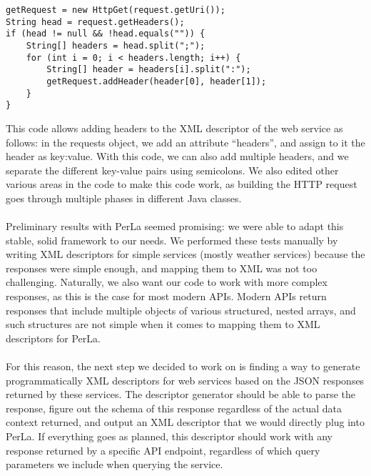 \begin{lstlisting}
getRequest = new HttpGet(request.getUri());
String head = request.getHeaders();
if (head != null && !head.equals("")) {
	String[] headers = head.split(";");
	for (int i = 0; i < headers.length; i++) {
		String[] header = headers[i].split(":");
		getRequest.addHeader(header[0], header[1]);
	}
}
\end{lstlisting}

This code allows adding headers to the XML descriptor of the web service as follows: in the requests object, we add an attribute ``headers'', and assign to it the header as key:value. With this code, we can also add multiple headers, and we separate the different key-value pairs using semicolons. We also edited other various areas in the code to make this code work, as building the HTTP request goes through multiple phases in different Java classes.\\\\
Preliminary results with PerLa seemed promising: we were able to adapt this stable, solid framework to our needs. We performed these tests manually by writing XML descriptors for simple services (mostly weather services) because the responses were simple enough, and mapping them to XML was not too challenging. Naturally, we also want our code to work with more complex responses, as this is the case for most modern APIs. Modern APIs return responses that include multiple objects of various structured, nested arrays, and such structures are not simple when it comes to mapping them to XML descriptors for PerLa.\\\\
For this reason, the next step we decided to work on is finding a way to generate programmatically XML descriptors for web services based on the JSON responses returned by these services. The descriptor generator should be able to parse the response, figure out the schema of this response regardless of the actual data context returned, and output an XML descriptor that we would directly plug into PerLa. If everything goes as planned, this descriptor should work with any response returned by a specific API endpoint, regardless of which query parameters we include when querying the service.\\\\
